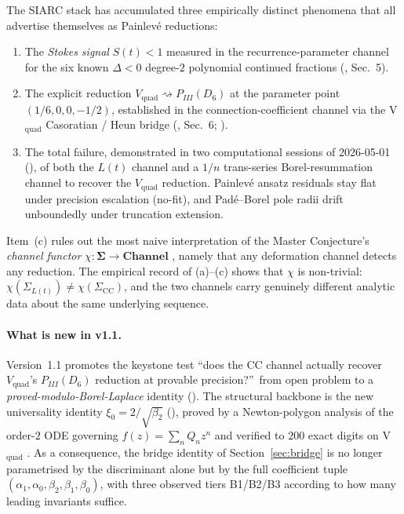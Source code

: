 \documentclass[11pt,reqno]{amsart}
\theoremstyle{plain}
\theoremstyle{definition}
\theoremstyle{remark}
\newcommand{\Channel}{\mathbf{Channel}}
\newcommand{\Sigmaspace}{\mathbf{\Sigma}}
\newcommand{\Lt}{L(t)}
\newcommand{\CC}{\mathrm{CC}}
\newcommand{\Vquad}{V_{\mathrm{quad}}}
\begin{document}
The SIARC stack has accumulated three empirically distinct
phenomena that all advertise themselves as Painlev\'e
reductions:
\begin{enumerate}[label=(\alph*)]
\item The \emph{Stokes signal} $S(t)<1$ measured in the
recurrence-parameter channel for the six known $\Delta<0$
degree-$2$ polynomial continued fractions
(\cite{siarc_pcf1_v13}, Sec.~5).
\item The explicit reduction
$\Vquad \rightsquigarrow P_{III}(D_6)$ at the parameter point
$(1/6, 0, 0, -1/2)$, established in the connection-coefficient
channel via the V$_\mathrm{quad}$ Casoratian / Heun bridge
(\cite{siarc_pcf1_v13}, Sec.~6;
\cite{slavyanov2000special, iwasaki1991from}).
\item The total failure, demonstrated in two computational
sessions of 2026-05-01 (\cite{siarc_painleve_deep_6x,
siarc_borel_5x, siarc_borel_kscan}), of both the $\Lt$ channel
and a $1/n$ trans-series Borel-resummation channel to recover
the $\Vquad$ reduction. Painlev\'e ansatz residuals stay flat
under precision escalation (no-fit), and Pad\'e--Borel pole
radii drift unboundedly under truncation extension.
\end{enumerate}
Item~(c) rules out the most naive interpretation of the
Master Conjecture's \emph{channel functor}
$\chi : \Sigmaspace \to \Channel$ \cite{siarc_umbrella},
namely that any deformation channel detects any reduction.
The empirical record of (a)--(c) shows that $\chi$ is
non-trivial: $\chi(\Sigma_{\Lt}) \ne \chi(\Sigma_{\CC})$,
and the two channels carry genuinely different analytic data
about the same underlying sequence.

\paragraph{What is new in v1.1.}
Version~1.1 promotes the keystone test
``does the $\CC$ channel actually recover $\Vquad$'s
$P_{III}(D_6)$ reduction at provable precision?''\
from open problem to a \emph{proved-modulo-Borel-Laplace}
identity (). The structural backbone is
the new universality identity
$\xi_0 = 2/\sqrt{\beta_2}$ (), proved by a
Newton-polygon analysis of the order-$2$ ODE governing
$f(z) = \sum_{n} Q_n z^n$ and verified to $200$ exact digits
on V$_{\text{quad}}$ \cite{siarc_cc_pipeline_g}. As a
consequence, the bridge identity of Section~\ref{sec:bridge}
is no longer parametrised by the discriminant alone but by
the full coefficient tuple
$(\alpha_1, \alpha_0, \beta_2, \beta_1, \beta_0)$, with three
observed tiers B1/B2/B3 according to how many leading
invariants suffice.
\end{document}
